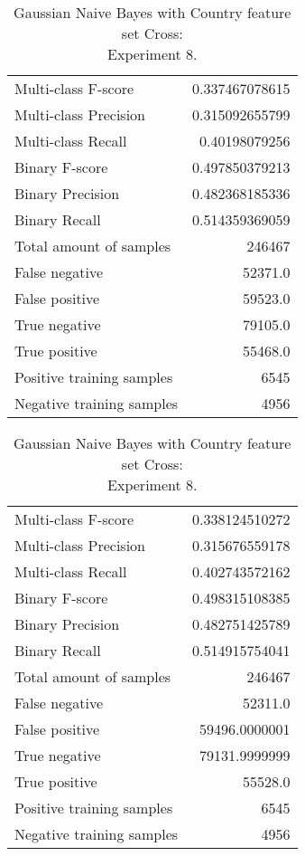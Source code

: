 \begin{table}[H]
\begin{minipage}{0.5\textwidth}
\caption{Gaussian Naive Bayes with Country feature set Cross: \\Experiment 7.}
\centering
\begin{tabular}{l r}
\toprule
Multi-class F-score & 0.337467078615 \\
Multi-class Precision & 0.315092655799 \\
Multi-class Recall & 0.40198079256 \\
\midrule
Binary F-score & 0.497850379213 \\
Binary Precision & 0.482368185336 \\
Binary Recall & 0.514359369059 \\
\midrule
Total amount of samples & 246467 \\
False negative & 52371.0 \\
False positive & 59523.0 \\
True negative & 79105.0 \\
True positive & 55468.0 \\
\midrule
Positive training samples & 6545 \\
Negative training samples & 4956 \\
\bottomrule
\end{tabular}
\end{minipage}
\hfillx
\begin{minipage}{0.5\textwidth}
\caption{Gaussian Naive Bayes with Country feature set Cross: \\Experiment 8.}
\centering
\begin{tabular}{l r}
\toprule
Multi-class F-score & 0.338124510272 \\
Multi-class Precision & 0.315676559178 \\
Multi-class Recall & 0.402743572162 \\
\midrule
Binary F-score & 0.498315108385 \\
Binary Precision & 0.482751425789 \\
Binary Recall & 0.514915754041 \\
\midrule
Total amount of samples & 246467 \\
False negative & 52311.0 \\
False positive & 59496.0000001 \\
True negative & 79131.9999999 \\
True positive & 55528.0 \\
\midrule
Positive training samples & 6545 \\
Negative training samples & 4956 \\
\bottomrule
\end{tabular}
\end{minipage}
\end{table}
